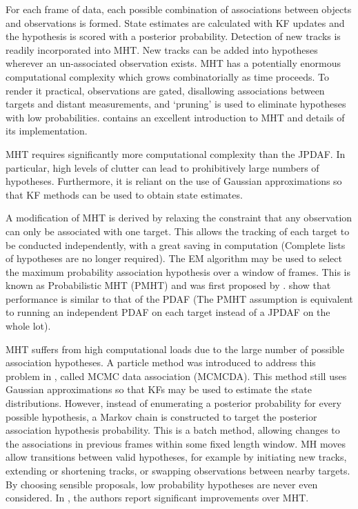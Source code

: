 For each frame of data, each possible combination of associations between objects and observations is formed. State estimates are calculated with KF updates and the hypothesis is scored with a posterior probability. Detection of new tracks is readily incorporated into MHT. New tracks can be added into hypotheses wherever an un-associated observation exists. MHT has a potentially enormous computational complexity which grows combinatorially as time proceeds. To render it practical, observations are gated, disallowing associations between targets and distant measurements, and `pruning' is used to eliminate hypotheses with low probabilities. \cite{Blackman2004} contains an excellent introduction to MHT and details of its implementation.

MHT requires significantly more computational complexity than the JPDAF. In particular, high levels of clutter can lead to prohibitively large numbers of hypotheses. Furthermore, it is reliant on the use of Gaussian approximations so that KF methods can be used to obtain state estimates. 

A modification of MHT is derived by relaxing the constraint that any observation can only be associated with one target. This allows the tracking of each target to be conducted independently, with a great saving in computation (Complete lists of hypotheses are no longer required). The EM algorithm may be used to select the maximum probability association hypothesis over a window of frames. This is known as Probabilistic MHT (PMHT) and was first proposed by \cite{Streit1994}. \cite{Willett2002} show that performance is similar to that of the PDAF (The PMHT assumption is equivalent to running an independent PDAF on each target instead of a JPDAF on the whole lot).

MHT suffers from high computational loads due to the large number of possible association hypotheses. A particle method was introduced to address this problem in \cite{Oh2004}, called MCMC data association (MCMCDA). This method still uses Gaussian approximations so that KFs may be used to estimate the state distributions. However, instead of enumerating a posterior probability for every possible hypothesis, a Markov chain is constructed to target the posterior association hypothesis probability. This is a batch method, allowing changes to the associations in previous frames within some fixed length window. MH moves allow transitions between valid hypotheses, for example by initiating new tracks, extending or shortening tracks, or swapping observations between nearby targets. By choosing sensible proposals, low probability hypotheses are never even considered. In \cite{Oh2004,Oh2009}, the authors report significant improvements over MHT.



